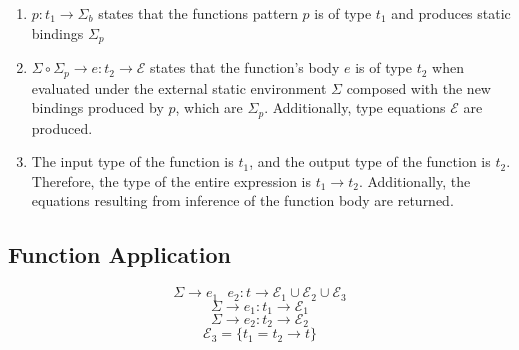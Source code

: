 \documentclass[titlepage]{article}
\begin{document}
\begin{enumerate}
\item $p : t_1 \rightarrow \Sigma_b$ states that the functions pattern $p$ is of type $t_1$ and produces static bindings $\Sigma_p$
\item $\Sigma \circ \Sigma_p \rightarrow e : t_2 \rightarrow \mathcal{E}$ states that the function's body $e$ is of type $t_2$ when evaluated under the external static environment $\Sigma$ composed with the new bindings produced by $p$, which are $\Sigma_p$. Additionally, type equations $\mathcal{E}$ are produced.
\item The input type of the function is $t_1$, and the output type of the function is $t_2$. Therefore, the type of the entire expression is $t_1 \rightarrow t_2$. Additionally, the equations resulting from inference of the function body are returned.
\end{enumerate}

\subsection{Function Application}

$$\Sigma \rightarrow e_1 \text{ } e_2 : t \rightarrow \mathcal{E}_1 \cup \mathcal{E}_2 \cup \mathcal{E}_3$$
\noindent\makebox[\linewidth]{\rule{2in}{0.4pt}}
$$\Sigma \rightarrow e_1 : t_1 \rightarrow \mathcal{E}_1$$
$$\Sigma \rightarrow e_2 : t_2 \rightarrow \mathcal{E}_2$$
$$\mathcal{E}_3 = \{t_1 = t_2 \rightarrow t\}$$
\end{document}
